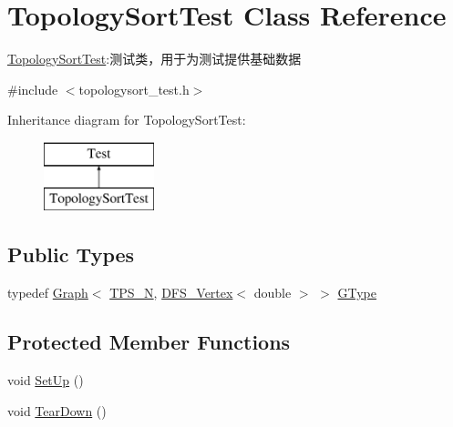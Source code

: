 \hypertarget{class_topology_sort_test}{}\section{Topology\+Sort\+Test Class Reference}
\label{class_topology_sort_test}


\hyperlink{class_topology_sort_test}{Topology\+Sort\+Test}\+:测试类，用于为测试提供基础数据  




{\ttfamily \#include $<$topologysort\+\_\+test.\+h$>$}

Inheritance diagram for Topology\+Sort\+Test\+:\begin{figure}[H]
\begin{center}
\leavevmode
\includegraphics[height=2.000000cm]{class_topology_sort_test}
\end{center}
\end{figure}
\subsection*{Public Types}
\begin{DoxyCompactItemize}
\item 
typedef \hyperlink{struct_introduction_to_algorithm_1_1_graph_algorithm_1_1_graph}{Graph}$<$ \hyperlink{topologysort__test_8h_aa3c6150ee8a91064cbf6c5380b7567ae}{T\+P\+S\+\_\+\+N}, \hyperlink{struct_introduction_to_algorithm_1_1_graph_algorithm_1_1_d_f_s___vertex}{D\+F\+S\+\_\+\+Vertex}$<$ double $>$ $>$ \hyperlink{class_topology_sort_test_aa530f6f774d1b97dbb3968d9e445ce21}{G\+Type}
\end{DoxyCompactItemize}
\subsection*{Protected Member Functions}
\begin{DoxyCompactItemize}
\item 
void \hyperlink{class_topology_sort_test_aa1b6dad41e9cbf8b6633a355ac743957}{Set\+Up} ()
\item 
void \hyperlink{class_topology_sort_test_a1195b18b412ae18f9011d4821b50eb1f}{Tear\+Down} ()
\end{DoxyCompactItemize}
